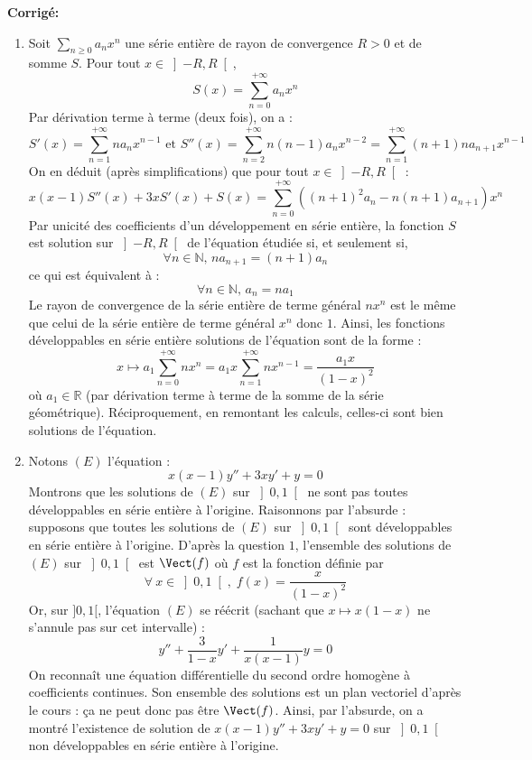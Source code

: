 \documentclass[a4paper,twoside,french,11pt]{VcCours}
\newcommand{\Sum}[2]{\sum_{#1}^{#2}}
\newcommand{\corr}{\textbf{Corrigé:}}
\begin{document}
\corr 
\begin{enumerate}
\item Soit $ \Sum{n \geq 0}{} a_n x^n$ une série entière de rayon de convergence $R > 0$ et de somme $S$. Pour tout $x \in \left] { - R,R} \right[$,
$$S(x) = \sum\limits_{n = 0}^{ + \infty } {a_n x^n } $$
Par dérivation terme à terme (deux fois), on a :
$$ S'(x) = \sum\limits_{n = 1}^{ + \infty } {na_n x^{n - 1} } \text{ et }S''(x) = \sum\limits_{n = 2}^{ + \infty } {n(n - 1)a_n x^{n - 2} }  = \sum\limits_{n = 1}^{ + \infty } {(n + 1)na_{n + 1} x^{n - 1} } $$
On en déduit (après simplifications) que pour tout $x \in \left] { - R,R} \right[$ :
$$ x(x - 1)S''(x) + 3xS'(x) + S(x) = \sum\limits_{n = 0}^{ + \infty } {\left( {(n + 1)^2 a_n  - n(n + 1)a_{n + 1} } \right)x^n } $$
Par unicité des coefficients d'un développement en série entière, la fonction $S$ est solution sur $\left] { - R,R} \right[$ de l'équation étudiée si, et seulement si, 
$$\forall n \in \mathbb{N}, \, na_{n + 1}  = (n + 1)a_n $$
ce qui est équivalent à :
$$\forall n \in \mathbb{N}, \, a_n  = na_1 $$
Le rayon de convergence de la série entière de terme général $nx^n$ est le même que celui de la série entière de terme général $x^n$ donc $1$. Ainsi,  les fonctions développables en série entière solutions de l'équation sont de la forme :
$$x \mapsto a_1 \sum\limits_{n = 0}^{ + \infty } {nx^n }  = a_1 x\sum\limits_{n = 1}^{ + \infty } nx^{n-1} = \dfrac{a_1 x}{(1-x)^2}$$
où $a_1 \in \mathbb{R}$ (par dérivation terme à terme de la somme de la série géométrique). Réciproquement, en remontant les calculs, celles-ci sont bien solutions de l'équation.
\item Notons $(E)$ l'équation :
$$x(x-1)y''+3xy'+y=0$$
Montrons que les solutions de $(E)$ sur $\left] 0,1\right[$ ne sont pas toutes développables en série entière à l'origine.  Raisonnons par l'absurde : supposons que toutes les solutions de $(E)$ sur $\left] 0,1\right[$ sont développables en série entière à l'origine. D'après la question $1$, l'ensemble des solutions de $(E)$ sur $\left] 0,1\right[$ est $\Vect(f)$ où $f$ est la fonction définie par 
$$\forall\:x\in \left] 0,1\right[, \; f(x)=\dfrac{x}{(1-x)^2}$$
Or, sur $]0,1[$, l'équation $(E)$ se réécrit (sachant que $x \mapsto x(1-x)$ ne s'annule pas sur cet intervalle) :
$$ y'' + \dfrac{3}{1-x}y' + \dfrac{1}{x(x-1)} y = 0$$
On reconnaît une équation différentielle du second ordre homogène à coefficients continues. Son ensemble des solutions est un plan vectoriel d'après le cours : ça ne peut donc pas être $\Vect(f)$. Ainsi, par l'absurde, on a montré l'existence de solution de $x(x-1)y''+3xy'+y=0$ sur $\left]0,1 \right[$ non développables en série entière à l'origine.
\end{enumerate}
\end{document}
